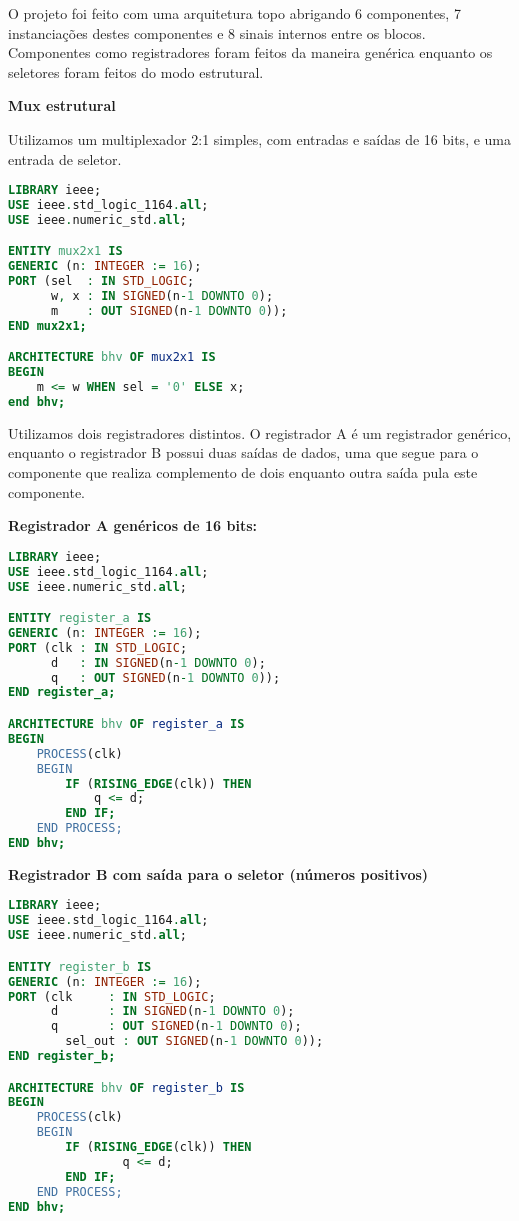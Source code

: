 \documentclass[a4paper]{article}
\begin{document}
O projeto foi feito com uma arquitetura topo abrigando 6 componentes, 7 instanciações destes componentes e 8 sinais internos entre os blocos.
Componentes como registradores foram feitos da maneira genérica enquanto os seletores foram feitos do modo estrutural.
\bigskip

\textbf{Mux estrutural}

Utilizamos um multiplexador 2:1 simples, com entradas e saídas de 16 bits, e uma entrada de seletor.

\begin{lstlisting}[language=VHDL]
LIBRARY ieee;
USE ieee.std_logic_1164.all;
USE ieee.numeric_std.all;

ENTITY mux2x1 IS
GENERIC (n: INTEGER := 16);
PORT (sel  : IN STD_LOGIC;
      w, x : IN SIGNED(n-1 DOWNTO 0);
	  m    : OUT SIGNED(n-1 DOWNTO 0));
END mux2x1;

ARCHITECTURE bhv OF mux2x1 IS
BEGIN
    m <= w WHEN sel = '0' ELSE x;
end bhv;
\end{lstlisting}
\bigskip

Utilizamos dois registradores distintos. O registrador A é um registrador genérico, enquanto o registrador B possui duas saídas de dados, uma que segue para o componente que realiza complemento de dois enquanto outra saída pula este componente.
\bigskip

\textbf{Registrador A genéricos de 16 bits:}
\begin{lstlisting}[language=VHDL]
LIBRARY ieee;
USE ieee.std_logic_1164.all;
USE ieee.numeric_std.all;

ENTITY register_a IS
GENERIC (n: INTEGER := 16);
PORT (clk : IN STD_LOGIC;
      d   : IN SIGNED(n-1 DOWNTO 0);
      q   : OUT SIGNED(n-1 DOWNTO 0));
END register_a;

ARCHITECTURE bhv OF register_a IS
BEGIN
    PROCESS(clk)
    BEGIN
        IF (RISING_EDGE(clk)) THEN
			q <= d;
        END IF;
    END PROCESS;
END bhv;
\end{lstlisting}

\pagebreak
\textbf{Registrador B com saída para o seletor (números positivos)}
\begin{lstlisting}[language=VHDL]
LIBRARY ieee;
USE ieee.std_logic_1164.all;
USE ieee.numeric_std.all;

ENTITY register_b IS
GENERIC (n: INTEGER := 16);
PORT (clk     : IN STD_LOGIC;
      d       : IN SIGNED(n-1 DOWNTO 0);
      q       : OUT SIGNED(n-1 DOWNTO 0);
		sel_out : OUT SIGNED(n-1 DOWNTO 0));
END register_b;

ARCHITECTURE bhv OF register_b IS
BEGIN
    PROCESS(clk)
    BEGIN
        IF (RISING_EDGE(clk)) THEN
				q <= d;
        END IF;
    END PROCESS;
END bhv;
\end{lstlisting}
\smallskip
\end{document}
